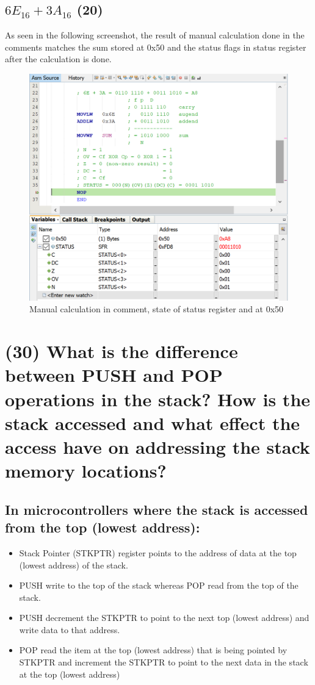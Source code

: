 \documentclass{article}
\begin{document}
\subsection{$6E_{16}+3A_{16}$ (20)}
As seen in the following screenshot, the result of manual calculation done in the comments matches the sum stored at 0x50 and the status flags in status register after the calculation is done.
\begin{figure}[H]
  \centering
  \includegraphics[width=\textwidth]{ECE3301_Assignment2_Add.png}
  \caption{Manual calculation in comment, state of status register and at 0x50}
\end{figure}

\newpage

\section{(30) What is the difference between PUSH and POP operations in the stack? How is the stack accessed and what effect the access have on addressing the stack memory locations?}


\subsection*{In microcontrollers where the stack is accessed from the top (lowest address):}
\begin{itemize}
\item Stack Pointer (STKPTR) register points to the address of data at the top (lowest address) of the stack.
\item PUSH write to the top of the stack whereas POP read from the top of the stack.
\item PUSH decrement the STKPTR to point to the next top (lowest address) and write data to that address.
\item POP read the item at the top (lowest address) that is being pointed by STKPTR and increment the STKPTR to point to the next data in the stack at the top (lowest address)
\end{itemize}
\end{document}
